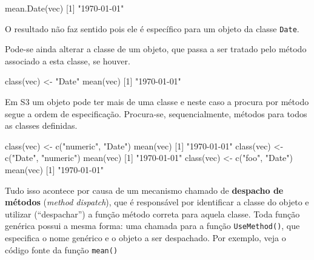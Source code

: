 \documentclass[
  10pt,
  a4paper]{book}
\newenvironment{Shaded}{\begin{snugshade}}{\end{snugshade}}
\newcommand{\DecValTok}[1]{\textcolor[rgb]{0.00,0.00,0.81}{#1}}
\newcommand{\FunctionTok}[1]{\textcolor[rgb]{0.00,0.00,0.00}{#1}}
\newcommand{\NormalTok}[1]{#1}
\newcommand{\OtherTok}[1]{\textcolor[rgb]{0.56,0.35,0.01}{#1}}
\newcommand{\StringTok}[1]{\textcolor[rgb]{0.31,0.60,0.02}{#1}}
\begin{document}
\begin{Shaded}
\begin{Highlighting}[]
\FunctionTok{mean.Date}\NormalTok{(vec)}
\NormalTok{[}\DecValTok{1}\NormalTok{] }\StringTok{"1970{-}01{-}01"}
\end{Highlighting}
\end{Shaded}

O resultado não faz sentido pois ele é específico para um objeto da
classe \texttt{Date}.

Pode-se ainda alterar a classe de um objeto, que passa a ser tratado
pelo método associado a esta classe, se houver.

\begin{Shaded}
\begin{Highlighting}[]
\FunctionTok{class}\NormalTok{(vec) }\OtherTok{\textless{}{-}} \StringTok{"Date"}
\FunctionTok{mean}\NormalTok{(vec)}
\NormalTok{[}\DecValTok{1}\NormalTok{] }\StringTok{"1970{-}01{-}01"}
\end{Highlighting}
\end{Shaded}

Em S3 um objeto pode ter mais de uma classe e neste caso a procura por método segue a ordem de especificação.
Procura-se, sequencialmente, métodos para todos as classes definidas.

\begin{Shaded}
\begin{Highlighting}[]
\FunctionTok{class}\NormalTok{(vec) }\OtherTok{\textless{}{-}} \FunctionTok{c}\NormalTok{(}\StringTok{"numeric"}\NormalTok{, }\StringTok{"Date"}\NormalTok{)}
\FunctionTok{mean}\NormalTok{(vec)}
\NormalTok{[}\DecValTok{1}\NormalTok{] }\StringTok{"1970{-}01{-}01"}
\FunctionTok{class}\NormalTok{(vec) }\OtherTok{\textless{}{-}} \FunctionTok{c}\NormalTok{(}\StringTok{"Date"}\NormalTok{, }\StringTok{"numeric"}\NormalTok{)}
\FunctionTok{mean}\NormalTok{(vec)}
\NormalTok{[}\DecValTok{1}\NormalTok{] }\StringTok{"1970{-}01{-}01"}
\FunctionTok{class}\NormalTok{(vec) }\OtherTok{\textless{}{-}} \FunctionTok{c}\NormalTok{(}\StringTok{"foo"}\NormalTok{, }\StringTok{"Date"}\NormalTok{)}
\FunctionTok{mean}\NormalTok{(vec)}
\NormalTok{[}\DecValTok{1}\NormalTok{] }\StringTok{"1970{-}01{-}01"}
\end{Highlighting}
\end{Shaded}

Tudo isso acontece por causa de um mecanismo chamado de \textbf{despacho de
métodos} (\emph{method dispatch}), que é responsável por identificar a
classe do objeto e utilizar (``despachar'') a função método correta para
aquela classe. Toda função genérica possui a mesma forma: uma chamada
para a função \texttt{UseMethod()}, que especifica o nome genérico e o objeto a
ser despachado. Por exemplo, veja o código fonte da função \texttt{mean()}
\end{document}
